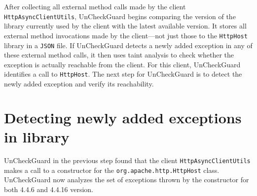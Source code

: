 After collecting all external method calls made by the client \texttt{HttpAsyncClientUtils}, UnCheckGuard begins comparing the version of the library currently used by the client with the latest available version. It stores all external method invocations made by the client—not just those to the \texttt{HttpHost} library in a \texttt{JSON} file. If UnCheckGuard detects a newly added exception in any of these external method calls, it then uses taint analysis to check whether the exception is actually reachable from the client. For this client, UnCheckGuard identifies a call to \texttt{HttpHost}. The next step for UnCheckGuard is to detect the newly added exception and verify its reachability.



\section{Detecting newly added exceptions in library} 

UnCheckGuard in the previous step found that the client \texttt{HttpAsyncClientUtils} makes a call to a constructor for the \texttt{org.apache.http.HttpHost} class. UnCheckGuard now analyzes the set of exceptions thrown by the constructor for both 4.4.6 and 4.4.16 version.


